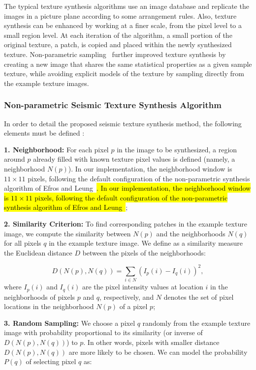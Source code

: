 \documentclass{ieeeaccess}
\DeclareRobustCommand{\DIFaddbegin}{\DIFOaddbegin \let\includegraphics\DIFaddincludegraphics} %
\DeclareRobustCommand{\DIFaddend}{\DIFOaddend \let\includegraphics\DIFOincludegraphics} %
\providecommand{\DIFadd}[1]{{\protect\color{blue}#1}}
\renewcommand{\DIFadd}[1]{\ifmmode#1\else\begingroup\let\protect\relax\hl{#1}\endgroup\fi}
\providecommand{\DIFaddbegin}{}
\providecommand{\DIFaddend}{}
\renewcommand{\DIFaddbegin}{}
\renewcommand{\DIFaddend}{}
\begin{document}
The typical texture synthesis algorithms use an image database and replicate the images in a picture plane according to some arrangement rules. Also, texture synthesis can be enhanced by working at a finer scale, from the pixel level to a small region level. At each iteration of the algorithm, a small portion of the original texture, a patch, is copied and placed within the newly synthesized texture. Non-parametric sampling~\cite{Efros1999} further improved texture synthesis by creating a new image that shares the same statistical properties as a given sample texture, while avoiding explicit models of the texture by sampling directly from the example texture images.


\subsubsection{Non-parametric Seismic Texture Synthesis Algorithm}

In order to detail the proposed seismic texture synthesis method, the following elements must be defined :

\textbf{1. Neighborhood:} For each pixel $p$ in the image to be synthesized, a region around $p$ already filled with known texture pixel values is defined (namely, a neighborhood $N(p)$)\DIFaddbegin \DIFadd{. In our implementation, the neighborhood window is $11 \times 11$ pixels, following the default configuration of the non-parametric synthesis algorithm of Efros and Leung~\cite{Efros1999}}\DIFaddend ;

\textbf{2. Similarity Criterion:} To find corresponding patches in the example texture image, we compute the similarity between $N(p)$ and the neighborhoods $N(q)$ for all pixels $q$ in the example texture image. We define as a similarity measure the Euclidean distance $D$ between the pixels of the neighborhoods:

\begin{equation}
D(N(p), N(q)) = \sum_{i \in N} \left( I_p(i) - I_q(i) \right)^2,
\end{equation}
where $I_p(i)$ and $I_q(i)$ are the pixel intensity values at location $i$ in the neighborhoods of pixels $p$ and $q$, respectively, and $N$ denotes the set of pixel locations in the neighborhood $N(p)$ of a pixel $p$;

\textbf{3. Random Sampling:} We choose a pixel $q$ randomly from the example texture image with probability proportional to its similarity (or inverse of $D(N(p), N(q))$) to $p$. In other words, pixels with smaller distance $D(N(p), N(q))$ are more likely to be chosen. We can model the probability $P(q)$ of selecting pixel $q$ as:
\end{document}

